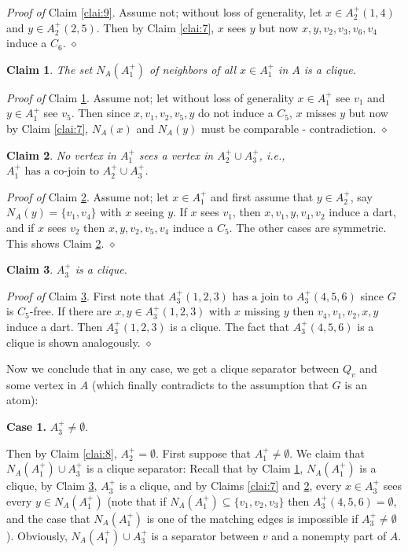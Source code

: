 \documentclass[11pt]{article}
\newcommand{\0}{\text{ has a co-join to }}
\newcommand{\1}{\text{ has a join to }}
\newtheorem{clai}{Claim}[section]
\begin{document}
\noindent
{\em Proof of} Claim \ref{clai:9}. Assume not; without loss of generality, let $x \in A_2^+(1,4)$ and $y \in A_2^+(2,5)$. Then by Claim \ref{clai:7}, $x$ sees $y$ but now $x,y,v_2,v_3,v_6,v_4$ induce a $C_6$. 
${\diamond}$

\begin{clai}\label{clai:10}
The set $N_A(A_1^+)$ of neighbors of all $x \in A_1^+$ in $A$ is a clique.
\end{clai}

\noindent
{\em Proof of} Claim \ref{clai:10}. Assume not; let without loss of generality $x \in A_1^+$ see $v_1$ and $y \in A_1^+$ see $v_5$. Then since $x,v_1,v_2,v_5,y$ do not induce a $C_5$, $x$ misses $y$ but now by Claim \ref{clai:7}, $N_A(x)$ and $N_A(y)$ must be comparable - contradiction. 
${\diamond}$

\begin{clai}\label{clai:11}
No vertex in $A_1^+$ sees a vertex in $A_2^+ \cup A_3^+$, i.e., $A_1^+ {\0} A_2^+ \cup A_3^+$.
\end{clai}

\noindent
{\em Proof of} Claim \ref{clai:11}. Assume not; let $x \in A_1^+$ and first assume that $y \in A_2^+$, say $N_A(y) = \{v_1,v_4\}$ with $x$ seeing $y$. If $x$ sees $v_1$, then $x,v_1,y,v_4,v_2$ induce a dart, and if $x$ sees $v_2$ then $x,y,v_2,v_5,v_4$ induce a $C_5$. The other cases are symmetric. This shows Claim \ref{clai:11}. 
${\diamond}$

\begin{clai}\label{clai:12}
$A_3^+$ is a clique.
\end{clai}

\noindent
{\em Proof of} Claim \ref{clai:12}. First note that $A_3^+(1,2,3){\1}A_3^+(4,5,6)$ since $G$ is $C_5$-free. If there are $x,y \in A_3^+(1,2,3)$ with $x$ missing $y$ then $v_4,v_1,v_2,x,y$ induce a dart. Then $A_3^+(1,2,3)$ is a clique. The fact that $A_3^+(4,5,6)$ is a clique is shown analogously. 
${\diamond}$

\medskip

Now we conclude that in any case, we get a clique separator between $Q_v$ and some vertex in $A$ (which finally contradicts to the assumption that $G$ is an atom):

\medskip

\noindent
{\bf Case 1.} $A_3^+ \neq \emptyset$. 

\medskip

Then by Claim \ref{clai:8}, $A_2^+ = \emptyset$.
First suppose that $A_1^+ \neq \emptyset$. We claim that $N_A(A_1^+) \cup A_3^+$ is a clique separator: Recall that by Claim \ref{clai:10}, $N_A(A_1^+)$ is a clique, by Claim \ref{clai:12}, $A_3^+$ is a clique, and by Claims \ref{clai:7} and \ref{clai:11}, every $x \in A_3^+$ sees every $y \in N_A(A_1^+)$ (note that if $N_A(A_1^+) \subseteq \{v_1,v_2,v_3\}$ then $A_3^+(4,5,6) = \emptyset$, and the case that $N_A(A_1^+)$ is one of the matching edges is impossible if $A_3^+ \neq \emptyset$). Obviously, $N_A(A_1^+) \cup A_3^+$ is a separator between $v$ and a nonempty part of $A$.
\end{document}
